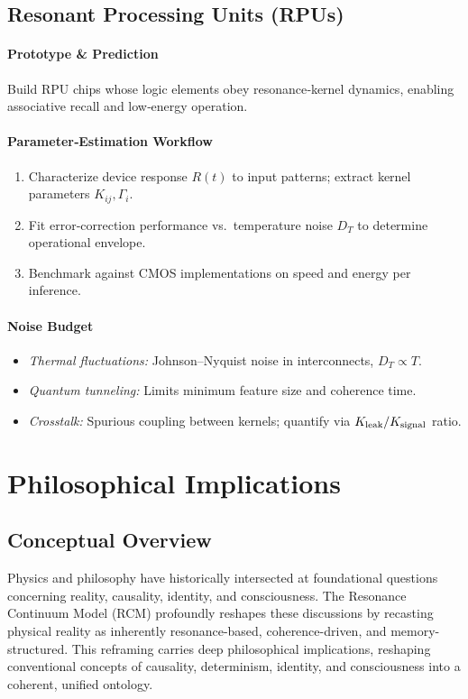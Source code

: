 \subsection{Resonant Processing Units (RPUs)}
\paragraph{Prototype \& Prediction}
Build RPU chips whose logic elements obey resonance‐kernel dynamics, enabling associative recall and low‐energy operation.
\paragraph{Parameter‐Estimation Workflow}
\begin{enumerate}
  \item Characterize device response $R(t)$ to input patterns; extract kernel parameters $K_{ij},\Gamma_i$.  
  \item Fit error‐correction performance vs.\ temperature noise $D_T$ to determine operational envelope.  
  \item Benchmark against CMOS implementations on speed and energy per inference.
\end{enumerate}
\paragraph{Noise Budget}
\begin{itemize}
  \item \emph{Thermal fluctuations:} Johnson–Nyquist noise in interconnects, $D_T\propto T$.  
  \item \emph{Quantum tunneling:} Limits minimum feature size and coherence time.  
  \item \emph{Crosstalk:} Spurious coupling between kernels; quantify via $K_{\rm leak}/K_{\rm signal}$ ratio.
\end{itemize}


\section{Philosophical Implications}

\subsection{Conceptual Overview}
Physics and philosophy have historically intersected at foundational questions concerning reality, causality, identity, and consciousness. The Resonance Continuum Model (RCM) profoundly reshapes these discussions by recasting physical reality as inherently resonance-based, coherence-driven, and memory-structured. This reframing carries deep philosophical implications, reshaping conventional concepts of causality, determinism, identity, and consciousness into a coherent, unified ontology.

